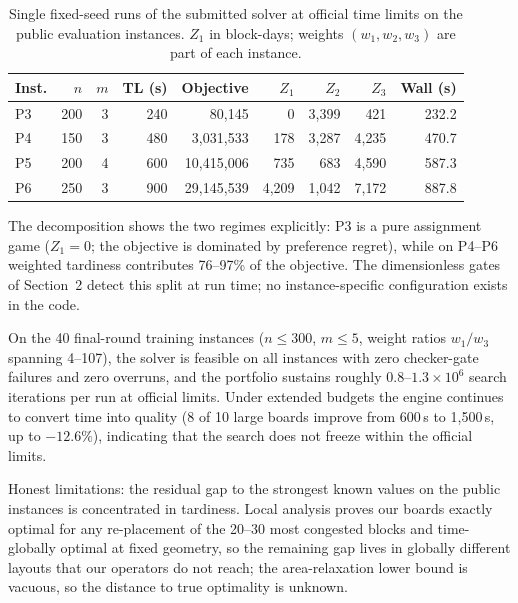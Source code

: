 \documentclass[runningheads]{llncs}
\begin{document}
\begin{table}[t]
\centering
\caption{Single fixed-seed runs of the submitted solver at official time
limits on the public evaluation instances. $Z_1$ in block-days; weights
$(w_1, w_2, w_3)$ are part of each instance.}
\label{tab:results}
\begin{tabular}{lrrrrrrrr}
\toprule
Inst. & $n$ & $m$ & TL (s) & Objective & $Z_1$ & $Z_2$ & $Z_3$ & Wall (s) \\
\midrule
P3 & 200 & 3 & 240 & 80{,}145 & 0 & 3{,}399 & 421 & 232.2 \\
P4 & 150 & 3 & 480 & 3{,}031{,}533 & 178 & 3{,}287 & 4{,}235 & 470.7 \\
P5 & 200 & 4 & 600 & 10{,}415{,}006 & 735 & 683 & 4{,}590 & 587.3 \\
P6 & 250 & 3 & 900 & 29{,}145{,}539 & 4{,}209 & 1{,}042 & 7{,}172 & 887.8 \\
\bottomrule
\end{tabular}
\end{table}

The decomposition shows the two regimes explicitly: P3 is a pure
assignment game ($Z_1 = 0$; the objective is dominated by preference regret),
while on P4--P6 weighted tardiness contributes 76--97\% of the objective.
The dimensionless gates of Section~2 detect this split at run time; no
instance-specific configuration exists in the code.

On the 40 final-round training instances ($n \le 300$, $m \le 5$, weight
ratios $w_1/w_3$ spanning 4--107), the solver is feasible on all instances
with zero checker-gate failures and zero overruns, and the portfolio
sustains roughly $0.8$--$1.3 \times 10^6$ search iterations per run at
official limits. Under extended budgets the engine continues to convert time
into quality (8 of 10 large boards improve from 600\,s to 1{,}500\,s, up to
$-12.6\%$), indicating that the search does not freeze within the official
limits.

Honest limitations: the residual gap to the strongest known values on the
public instances is concentrated in tardiness. Local analysis proves our
boards exactly optimal for any re-placement of the 20--30 most congested
blocks and time-globally optimal at fixed geometry, so the remaining gap
lives in globally different layouts that our operators do not reach; the
area-relaxation lower bound is vacuous, so the distance to true optimality
is unknown.

\end{document}
